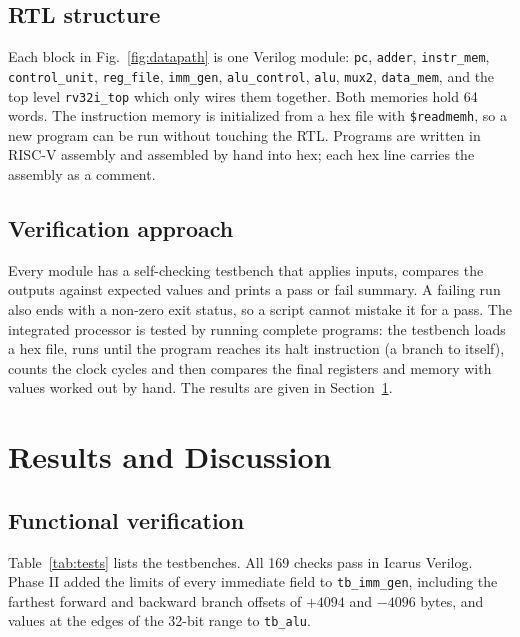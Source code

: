 \documentclass[conference]{IEEEtran}
\begin{document}
\subsection{RTL structure}
Each block in Fig.~\ref{fig:datapath} is one Verilog module: \texttt{pc},
\texttt{adder}, \texttt{instr\_mem}, \texttt{control\_unit},
\texttt{reg\_file}, \texttt{imm\_gen}, \texttt{alu\_control}, \texttt{alu},
\texttt{mux2}, \texttt{data\_mem}, and the top level \texttt{rv32i\_top}
which only wires them together. Both memories hold 64 words. The instruction
memory is initialized from a hex file with \texttt{\$readmemh}, so a new
program can be run without touching the RTL. Programs are written in RISC-V
assembly and assembled by hand into hex; each hex line carries the assembly
as a comment.

\subsection{Verification approach}
Every module has a self-checking testbench that applies inputs, compares the
outputs against expected values and prints a pass or fail summary. A failing
run also ends with a non-zero exit status, so a script cannot mistake it for
a pass. The integrated processor is tested by running complete programs: the
testbench loads a hex file, runs until the program reaches its halt
instruction (a branch to itself), counts the clock cycles and then compares
the final registers and memory with values worked out by hand. The results
are given in Section~\ref{sec:results}.

\section{Results and Discussion}
\label{sec:results}

\subsection{Functional verification}
Table~\ref{tab:tests} lists the testbenches. All 169 checks pass in Icarus
Verilog. Phase II added the limits of every immediate field to
\texttt{tb\_imm\_gen}, including the farthest forward and backward branch
offsets of $+4094$ and $-4096$ bytes, and values at the edges of the 32-bit
range to \texttt{tb\_alu}.
\end{document}
